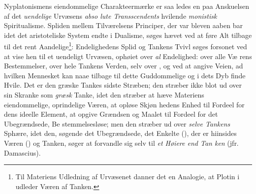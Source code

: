 Nyplatonismens eiendommelige Charakteermærke er saa\-%
ledes en paa Anskuelsen af det \emph{uendelige} Urvæsens \emph{abso\-%
lute Transscendents} hvilende \emph{monistisk} Spiritualisme.
Spliden mellem Tilværelsens Principer, der var bleven aaben\-%
bar idet det aristoteliske System endte i Dualisme, søges hævet
ved at føre Alt tilbage til det rent Aandelige\footnote{Til Materiens Udledning af Urvæsenet danner det en Analogie, at
Plotin i  udleder Væren af Tanken.}: Endelighedens
Splid og Tankens Tvivl søges forsonet ved at vise hen til et
uendeligt Urvæsen, ophøiet over \emph{al} Endelighed: over alle Væ\-%
rens Bestemmelser, over hele Tankens Verden, selv over ,
og ved at angive Veien, ad hvilken Mennesket kan naae tilbage
til dette Guddommelige og i dets Dyb finde Hvile. Det er
den græske Tankes sidste Stræben; den stræber ikke blot ud
over sin Skranke som \emph{græsk} Tanke, idet den stræber at hæve
Materiens eiendommelige, oprindelige Væren, at opløse Skjøn\-%
hedens Enhed til Fordeel for dens ideelle Element, at opgive
Grændsen og Maalet til Fordeel for det Ubegrændsede, Be\-%
stemmelsesløse; men den stræber ud over \emph{selve Tankens}
Sphære, idet den, søgende det Ubegrændsede, det Enkelte (), der er hiinsides Væren () og
Tanken, søger at forvandle sig selv til \emph{et Høiere end Tan\-%
ken} (jfr. Damascius).

